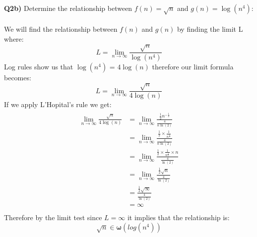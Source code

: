 \documentclass[12pt]{article}
\begin{document}
\begin{adjustwidth}{0em}{0pt}
\textbf{Q2b)} Determine the relationship between $f(n) = \sqrt{n}$ and $g(n) = \log(n^4)$:\\ \\
We will find the relationship between $f(n)$ and $g(n)$ by finding the limit L where:
\[ L =  \lim_{n\to\infty}\frac{\sqrt{n}}{\log(n^4)} \]
Log rules show us that $\log(n^4)$ = $4\log(n)$ therefore our limit formula becomes:
\[ L =  \lim_{n\to\infty}\frac{\sqrt{n}}{4\log(n)} \]
If we apply L'Hopital's rule we get:
\begin{align*}
    \begin{aligned}
       \lim_{n\to\infty}\frac{\sqrt{n}}{4\log(n)} &= \lim_{n\to\infty}\frac{\frac{1}{2}n^{-\frac{1}{2}}}{\frac{4}{n\ln(2)}} \\
       &= \lim_{n\to\infty}\frac{\frac{1}{2}\times\frac{1}{n^{\frac{1}{2}}}}{\frac{4}{n\ln(2)}} \\
       &= \lim_{n\to\infty}\frac{\frac{1}{2}\times\frac{1}{n^{\frac{1}{2}}}\times{n}}{\frac{4}{\ln(2)}} \\
       &= \lim_{n\to\infty}\frac{\frac{1}{2}\sqrt{n}}{\frac{4}{\ln(2)}} \\
       &= \frac{\frac{1}{2}\sqrt{\infty}}{\frac{4}{\ln(2)}} \\
       &= \infty \\
    \end{aligned}
\end{align*}
Therefore by the limit test since $L = \infty$ it implies that the relationship is:
\[ \sqrt{n} \in \bm{\omega}(log(n^4)) \]\\
\end{adjustwidth}
\newpage
\end{document}
